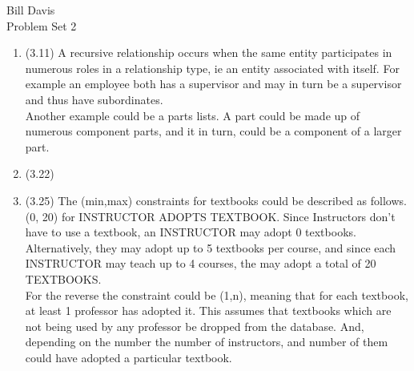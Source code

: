 \documentclass[11pt,fleqn]{article}
\begin{document}
\noindent Bill Davis \\
 Problem Set 2

\begin{enumerate}
\item (3.11) %
A recursive relationship occurs when the same entity participates in numerous roles in a relationship type, ie an entity associated with itself. For example an employee both has a supervisor and may in turn be a supervisor and thus have subordinates. \\
Another example could be a parts lists. A part could be made up of numerous component parts, and it in turn, could be a component of a larger part. 

\item (3.22)%
\pagebreak
\item (3.25) %
The (min,max) constraints for textbooks could be described as follows. (0, 20) for INSTRUCTOR ADOPTS TEXTBOOK. Since Instructors don't have to use a textbook, an INSTRUCTOR may adopt 0 textbooks. Alternatively, they may adopt up to 5 textbooks per course, and since each INSTRUCTOR may teach up to 4 courses, the may adopt a total of 20 TEXTBOOKS. \\
For the reverse the constraint could be (1,n), meaning that for each textbook, at least 1 professor has adopted it. This assumes that textbooks which are not being used by any professor be dropped from the database. And, depending on the number the number of instructors, and number of them could have adopted a particular textbook. 


\end{enumerate}
\end{document}
